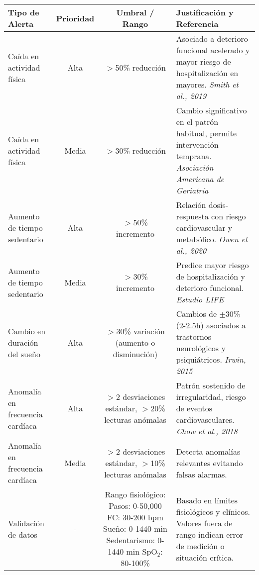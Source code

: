 \begin{table}[htbp]
    \centering
    \renewcommand{\arraystretch}{1.25}
    \begin{tabularx}{\textwidth}{|l|c|c|X|}
        \hline
        \textbf{Tipo de Alerta} & \textbf{Prioridad} & \textbf{Umbral / Rango} & \textbf{Justificación y Referencia} \\
        \hline
        Caída en actividad física & Alta & $>$50\% reducción & Asociado a deterioro funcional acelerado y mayor riesgo de hospitalización en mayores. \newline \textit{Smith et al., 2019} \\
        Caída en actividad física & Media & $>$30\% reducción & Cambio significativo en el patrón habitual, permite intervención temprana. \newline \textit{Asociación Americana de Geriatría} \\
        \hline
        Aumento de tiempo sedentario & Alta & $>$50\% incremento & Relación dosis-respuesta con riesgo cardiovascular y metabólico. \newline \textit{Owen et al., 2020} \\
        Aumento de tiempo sedentario & Media & $>$30\% incremento & Predice mayor riesgo de hospitalización y deterioro funcional. \newline \textit{Estudio LIFE} \\
        \hline
        Cambio en duración del sueño & Alta & $>$30\% variación (aumento o disminución) & Cambios de $\pm$30\% (2-2.5h) asociados a trastornos neurológicos y psiquiátricos. \newline \textit{Irwin, 2015} \\
        \hline
        Anomalía en frecuencia cardíaca & Alta & $>$2 desviaciones estándar, $>$20\% lecturas anómalas & Patrón sostenido de irregularidad, riesgo de eventos cardiovasculares. \newline \textit{Chow et al., 2018} \\
        Anomalía en frecuencia cardíaca & Media & $>$2 desviaciones estándar, $>$10\% lecturas anómalas & Detecta anomalías relevantes evitando falsas alarmas. \\
        \hline
        Validación de datos & - & Rango fisiológico: \newline Pasos: 0-50,000 \newline FC: 30-200 bpm \newline Sueño: 0-1440 min \newline Sedentarismo: 0-1440 min \newline SpO$_2$: 80-100\% & Basado en límites fisiológicos y clínicos. Valores fuera de rango indican error de medición o situación crítica. \\

\end{tabularx}
\end{table}

